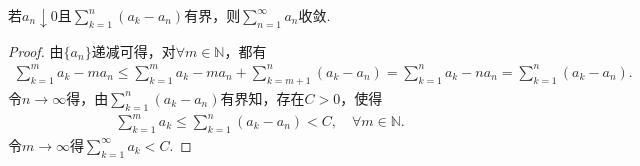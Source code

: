 \documentclass[../../main.tex]{subfiles}
\begin{document}
\begin{proposition}
若$a_n \downarrow 0$且$\sum_{k=1}^n \left( a_k - a_n \right)$有界，则$\sum_{n=1}^{\infty} a_n$收敛.
\end{proposition}
\begin{proof}
由$\{a_n\}$递减可得，对$\forall m \in \mathbb{N}$，都有
\begin{align*}
\sum_{k=1}^m a_k - m a_n \leqslant \sum_{k=1}^m a_k - m a_n + \sum_{k=m+1}^n \left( a_k - a_n \right) = \sum_{k=1}^n a_k - n a_n = \sum_{k=1}^n \left( a_k - a_n \right).
\end{align*}
令$n \rightarrow \infty$得，由$\sum_{k=1}^n \left( a_k - a_n \right)$有界知，存在$C > 0$，使得
\begin{align*}
\sum_{k=1}^m a_k \leqslant \sum_{k=1}^n \left( a_k - a_n \right) < C, \quad \forall m \in \mathbb{N}.
\end{align*}
令$m \rightarrow \infty$得$\sum_{k=1}^{\infty} a_k < C$.

\end{proof}
\end{document}
